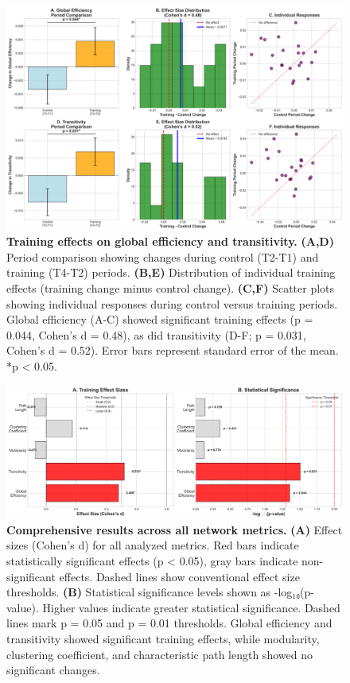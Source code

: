 \documentclass[12pt,a4paper]{article}
\begin{document}
\begin{figure}[H]
\centering
\includegraphics[width=\textwidth]{comprehensive_results/Figure2_MainResults.png}
\caption{\textbf{Training effects on global efficiency and transitivity.} \textbf{(A,D)} Period comparison showing changes during control (T2-T1) and training (T4-T2) periods. \textbf{(B,E)} Distribution of individual training effects (training change minus control change). \textbf{(C,F)} Scatter plots showing individual responses during control versus training periods. Global efficiency (A-C) showed significant training effects (p = 0.044, Cohen's d = 0.48), as did transitivity (D-F; p = 0.031, Cohen's d = 0.52). Error bars represent standard error of the mean. *p < 0.05.}
\label{fig:main_results}
\end{figure}

\begin{figure}[H]
\centering
\includegraphics[width=\textwidth]{comprehensive_results/Figure3_ComprehensiveResults.png}
\caption{\textbf{Comprehensive results across all network metrics.} \textbf{(A)} Effect sizes (Cohen's d) for all analyzed metrics. Red bars indicate statistically significant effects (p < 0.05), gray bars indicate non-significant effects. Dashed lines show conventional effect size thresholds. \textbf{(B)} Statistical significance levels shown as -log₁₀(p-value). Higher values indicate greater statistical significance. Dashed lines mark p = 0.05 and p = 0.01 thresholds. Global efficiency and transitivity showed significant training effects, while modularity, clustering coefficient, and characteristic path length showed no significant changes.}
\label{fig:comprehensive_results}
\end{figure}
\end{document}
